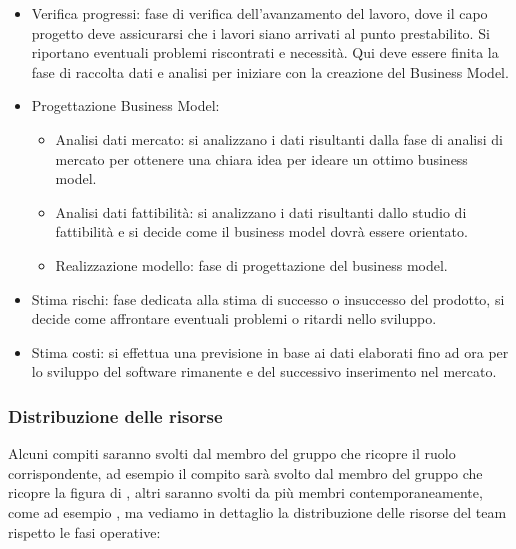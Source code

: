 \begin{itemize}
\begin{itemize}
\end{itemize}
\item Verifica progressi: fase di verifica dell'avanzamento del lavoro, dove il capo progetto deve assicurarsi che i lavori siano arrivati al punto prestabilito. Si riportano eventuali problemi riscontrati e necessità. Qui deve essere finita la fase di raccolta dati e analisi per iniziare con la creazione del Business Model. 
\item Progettazione Business Model:
\begin{itemize}
\item Analisi dati mercato: si analizzano i dati risultanti dalla fase di analisi di mercato per ottenere una chiara idea per ideare un ottimo business model.
\item Analisi dati fattibilità: si analizzano i dati risultanti dallo studio di fattibilità e si decide come il business model dovrà essere orientato.
\item Realizzazione modello: fase di progettazione del business model.
\end{itemize}
\item Stima rischi: fase dedicata alla stima di successo o insuccesso del prodotto, si decide come affrontare eventuali problemi o ritardi nello sviluppo.
\item Stima costi: si effettua una previsione in base ai dati elaborati fino ad ora per lo sviluppo del software rimanente e del successivo inserimento nel mercato.
\end{itemize}

\newpage
\subsubsection{Distribuzione delle risorse}
Alcuni compiti saranno svolti dal membro del gruppo che ricopre il ruolo corrispondente, ad esempio il compito  sarà svolto dal membro del gruppo che ricopre la figura di , altri saranno svolti da più membri contemporaneamente, come ad esempio , ma vediamo in dettaglio la distribuzione delle risorse del team rispetto le fasi operative: \\

